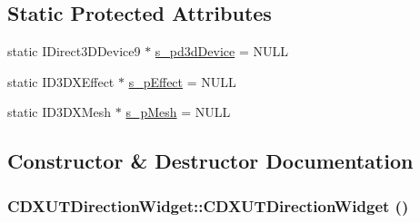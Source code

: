 \subsection*{Static Protected Attributes}
\begin{DoxyCompactItemize}
\item 
static IDirect3DDevice9 $\ast$ \hyperlink{class_c_d_x_u_t_direction_widget_a0ee2ebc3fe9b6da8bef84030a4ccf14a}{s\_\-pd3dDevice} = NULL
\item 
static ID3DXEffect $\ast$ \hyperlink{class_c_d_x_u_t_direction_widget_ac14ac40b7d8cc55ec2979cf77f42a448}{s\_\-pEffect} = NULL
\item 
static ID3DXMesh $\ast$ \hyperlink{class_c_d_x_u_t_direction_widget_a9d801af6502753f1d6fd4747f18f0a08}{s\_\-pMesh} = NULL
\end{DoxyCompactItemize}


\subsection{Constructor \& Destructor Documentation}
\hypertarget{class_c_d_x_u_t_direction_widget_ab7899fd28008dba0d9e116c4c122e379}{
\subsubsection[{CDXUTDirectionWidget}]{\setlength{\rightskip}{0pt plus 5cm}CDXUTDirectionWidget::CDXUTDirectionWidget ()}}
\label{class_c_d_x_u_t_direction_widget_ab7899fd28008dba0d9e116c4c122e379}


